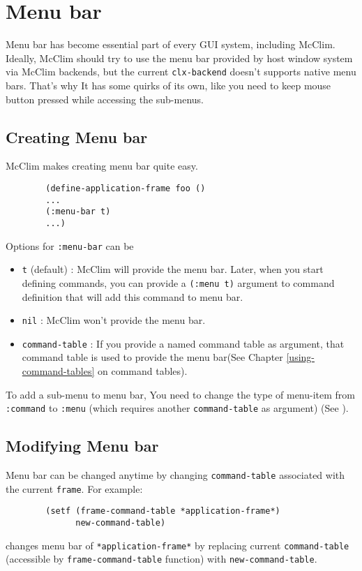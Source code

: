 \chapter{Menu bar}

Menu bar has become essential part of every GUI system, including McClim. Ideally, McClim should try to use the menu bar provided by host window system via McClim backends, but the current \texttt{clx-backend} doesn't supports native menu bars. That's why It has some quirks of its own, like you need to keep mouse button pressed while accessing the sub-menus.

\section{Creating Menu bar}
\label{creating-menu-bar}

McClim makes creating menu bar quite easy.

\begin{verbatim}
        (define-application-frame foo ()
        ...
        (:menu-bar t)
        ...)
\end{verbatim}

Options for \texttt{:menu-bar} can be
\begin{itemize}
\item
  \texttt{t} (default) : McClim will provide the menu bar. Later, when you start defining commands, you can provide a \texttt{(:menu t)} argument to command definition that will add this command to menu bar.
\item
  \texttt{nil} : McClim won’t provide the menu bar.
\item
  \texttt{command-table} : If you provide a named command table as argument, that command table is used to provide the menu bar(See Chapter \ref{using-command-tables} on command tables). 
\end{itemize}

To add a sub-menu to menu bar, You need to change the type of menu-item from \texttt{:command} to \texttt{:menu} (which requires another \texttt{command-table} as argument) (See ). 

\section{Modifying Menu bar}

Menu bar can be changed anytime by changing \texttt{command-table} associated with the current \texttt{frame}. For example:
\begin{verbatim}
        (setf (frame-command-table *application-frame*) 
              new-command-table)
\end{verbatim}
changes menu bar of \texttt{*application-frame*} by replacing current \texttt{command-table} (accessible by \texttt{frame-command-table} function) with \texttt{new-command-table}.

